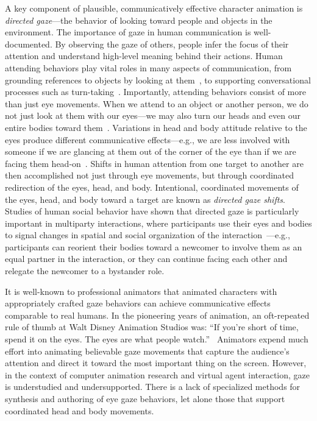 A key component of plausible, communicatively effective character animation is \emph{directed gaze}---the behavior of looking toward people and objects in the environment.
The importance of gaze in human communication is well-documented. By observing the gaze of others, people infer the focus of their attention and understand high-level meaning behind their actions. Human attending behaviors play vital roles in many aspects of communication, from grounding references to objects by looking at them~\citep{hanna2007speakers,preissler2005role}, to supporting conversational processes such as turn-taking~\citep{wiemann1975turn}.
Importantly, attending behaviors consist of more than just eye movements. When we attend to an object or another person, we do not just look at them with our eyes---we may also turn our heads and even our entire bodies toward them~\citep{langton2000eyes}. Variations in head and body attitude relative to the eyes produce different communicative effects---e.g., we are less involved with someone if we are glancing at them out of the corner of the eye than if we are facing them head-on~\citep{kendon1990conducting,schegloff1998bodytorque}.
Shifts in human attention from one target to another are then accomplished not just through eye movements, but through coordinated redirection of the eyes, head, and body. Intentional, coordinated movements of the eyes, head, and body toward a target are known as \emph{directed gaze shifts}.
Studies of human social behavior have shown that directed gaze is particularly important in multiparty interactions, where participants use their eyes and bodies to signal changes in spatial and social organization of the interaction~\citep{kendon1990conducting,mutlu2012conversational}---e.g., participants can reorient their bodies toward a newcomer to involve them as an equal partner in the interaction, or they can continue facing each other and relegate the newcomer to a bystander role.

It is well-known to professional animators that animated characters with appropriately crafted gaze behaviors can achieve communicative effects comparable to real humans. In the pioneering years of animation, an oft-repeated rule of thumb at Walt Disney Animation Studios was: ``If you're short of time, spend it on the eyes. The eyes are what people watch.''~\citep{thomas1981illusion} Animators expend much effort into animating believable gaze movements that capture the audience's attention and direct it toward the most important thing on the screen.
However, in the context of computer animation research and virtual agent interaction, gaze is understudied and undersupported. There is a lack of specialized methods for synthesis and authoring of eye gaze behaviors, let alone those that support coordinated head and body movements.

